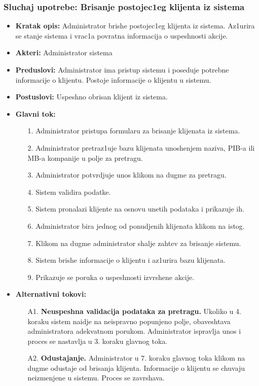 \subsubsection{Sluchaj upotrebe: Brisanje postojec1eg klijenta iz sistema}

\begin{itemize}
\item{\textbf{Kratak opis:} Administrator brishe postojec1eg klijenta iz sistema. Az1urira se stanje sistema i vrac1a povratna informacija o uspeshnosti akcije.}
\item{\textbf{Akteri:} Administrator sistema}

\item{\textbf{Preduslovi:} Administrator ima pristup sistemu i poseduje potrebne informacije o klijentu. Postoje informacije o klijentu u sistemu.}
\item{\textbf{Postuslovi:} Uspeshno obrisan klijent iz sistema.}
\item{\textbf{Glavni tok:} 
\begin{enumerate}
    \item [1.] Administrator pristupa formularu za brisanje klijenata iz sistema.
    \item[2.] Administrator pretraz1uje bazu klijenata unoshenjem naziva, PIB-a ili MB-a kompanije u polje za pretragu.
    \item[3.] Administrator potvrdjuje unos klikom na dugme za pretragu.
    \item[4.] Sistem validira podatke.
    \item[5.] Sistem pronalazi klijente na osnovu unetih podataka i prikazuje ih.
    \item[6.] Administrator bira jednog od ponudjenih klijenata klikom na istog.
    \item[7.] Klikom na dugme administrator shalje zahtev za brisanje sistemu.
    \item[8.] Sistem brishe informacije o klijentu i az1urira bazu klijenata.
    \item[9.] Prikazuje se poruka o uspeshnosti izvrshene akcije.
\end{enumerate}

}
\item{\textbf{Alternativni tokovi:} 
\begin{enumerate}
    \item [A1.] \textbf{Neuspeshna validacija podataka za pretragu.} Ukoliko u 4. koraku sistem naidje na neispravno popunjeno polje, obaveshtava administratora adekvatnom porukom. Administrator ispravlja unos i proces se nastavlja u 3. koraku glavnog toka.
    \item[A2.] \textbf{Odustajanje.} Administrator u 7. koraku glavnog toka klikom na dugme odustaje od brisanja klijenta. Informacije o klijentu se chuvaju neizmenjene u sistemu. Proces se zavrshava.
\end{enumerate}
}
\end{itemize}

